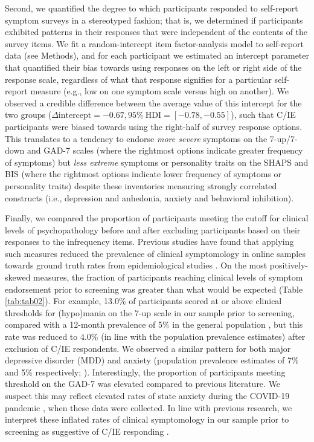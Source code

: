\documentclass[a4paper,notitlepage,12pt]{article}
\begin{document}
Second, we quantified the degree to which participants responded to self-report symptom surveys in a stereotyped fashion; that is, we determined if participants exhibited patterns in their responses that were independent of the contents of the survey items. We fit a random-intercept item factor-analysis model \cite{maydeu2006random} to self-report data (see Methods), and for each participant we estimated an intercept parameter that quantified their bias towards using responses on the left or right side of the response scale, regardless of what that response signifies for a particular self-report measure (e.g., low on one symptom scale versus high on another). We observed a credible difference between the average value of this intercept for the two groups ($\Delta \text{intercept} = -0.67, 95\% \ \text{HDI} = [-0.78, -0.55]$), such that C/IE participants were biased towards using the right-half of survey response options. This translates to a tendency to endorse \emph{more severe} symptoms on the 7-up/7-down and GAD-7 scales (where the rightmost options indicate greater frequency of symptoms) but \emph{less extreme} symptoms or personality traits on the SHAPS and BIS (where the rightmost options indicate lower frequency of symptoms or personality traits) despite these inventories measuring strongly correlated constructs (i.e., depression and anhedonia, anxiety and behavioral inhibition).

Finally, we compared the proportion of participants meeting the cutoff for clinical levels of psychopathology before and after excluding participants based on their responses to the infrequency items. Previous studies have found that applying such measures reduced the prevalence of clinical symptomology in online samples towards ground truth rates from epidemiological studies \cite{ophir2020turker}. On the most positively-skewed measures, the fraction of participants reaching clinical levels of symptom endorsement prior to screening was greater than what would be expected (Table \ref{tab:tab02}). For example, 13.0\% of participants scored at or above clinical thresholds for (hypo)mania on the 7-up scale in our sample prior to screening, compared with a 12-month prevalence of 5\% in the general population \cite{merikangas2007lifetime, merikangas2012true}, but this rate was reduced to 4.0\% (in line with the population prevalence estimates) after exclusion of C/IE respondents. We observed a similar pattern for both major depressive disorder (MDD) and anxiety (population prevalence estimates of 7\% and 5\% respectively; \cite{kessler2012twelve, lowe2008validation, hinz2017psychometric}). Interestingly, the proportion of participants meeting threshold on the GAD-7 was elevated compared to previous literature. We suspect this may reflect elevated rates of state anxiety during the COVID-19 pandemic \cite{yarrington2021impact}, when these data were collected. In line with previous research, we interpret these inflated rates of clinical symptomology in our sample prior to screening as suggestive of C/IE responding \cite{ophir2020turker}.
\end{document}
